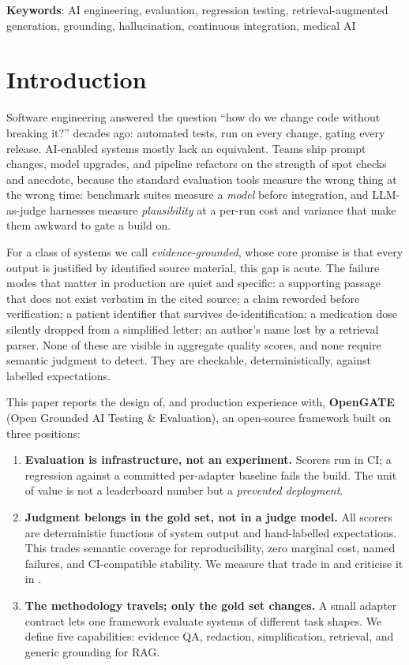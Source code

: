\documentclass[11pt,a4paper]{article}
\begin{document}
\noindent\textbf{Keywords}: AI engineering, evaluation, regression testing, retrieval-augmented
generation, grounding, hallucination, continuous integration, medical AI

\section{Introduction}

Software engineering answered the question ``how do we change code without breaking it?'' decades
ago: automated tests, run on every change, gating every release. AI-enabled systems mostly lack an
equivalent. Teams ship prompt changes, model upgrades, and pipeline refactors on the strength of
spot checks and anecdote, because the standard evaluation tools measure the wrong thing at the wrong
time: benchmark suites measure a \emph{model} before integration, and LLM-as-judge harnesses measure
\emph{plausibility} at a per-run cost and variance that make them awkward to gate a build on.

For a class of systems we call \emph{evidence-grounded}, whose core promise is that every output is
justified by identified source material, this gap is acute. The failure modes that
matter in production are quiet and specific: a supporting passage that does not exist verbatim in the
cited source; a claim reworded before verification; a patient identifier that survives
de-identification; a medication dose silently dropped from a simplified letter; an author's name lost
by a retrieval parser. None of these are visible in aggregate quality scores, and none require
semantic judgment to detect. They are checkable, deterministically, against labelled expectations.

This paper reports the design of, and production experience with, \textbf{OpenGATE} (Open Grounded AI
Testing \& Evaluation), an open-source framework built on three positions:

\begin{enumerate}
  \item \textbf{Evaluation is infrastructure, not an experiment.} Scorers run in CI; a regression
  against a committed per-adapter baseline fails the build. The unit of value is not a leaderboard
  number but a \emph{prevented deployment}.
  \item \textbf{Judgment belongs in the gold set, not in a judge model.} All scorers are
  deterministic functions of system output and hand-labelled expectations. This trades semantic
  coverage for reproducibility, zero marginal cost, named failures, and CI-compatible stability. We
  measure that trade in  and criticise it in .
  \item \textbf{The methodology travels; only the gold set changes.} A small adapter contract lets
  one framework evaluate systems of different task shapes. We define five capabilities: evidence QA,
  redaction, simplification, retrieval, and generic grounding for RAG.
\end{enumerate}
\end{document}
